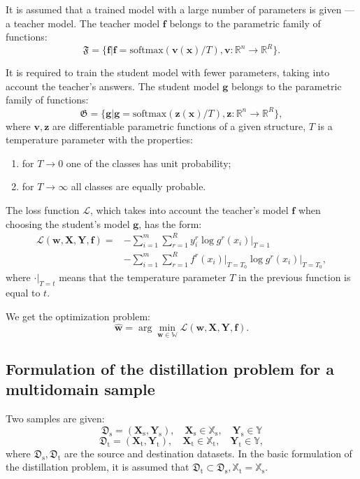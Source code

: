 \documentclass[12pt]{article}
\begin{document}
It is assumed that a trained model with a large number of parameters is given --- a teacher model. The teacher model $\mathbf{f}$ belongs to the parametric family of functions: $$\mathfrak{F}=\{\mathbf{f}|\mathbf{f}=\text{softmax}(\mathbf{v(x)} /T), \mathbf{v}:\mathbb{R}^{n}\rightarrow \mathbb{R}^{R}\}.$$

It is required to train the student model with fewer parameters, taking into account the teacher's answers. The student model $\mathbf{g}$ belongs to the parametric family of functions: $$\mathfrak{G}=\{\mathbf{g}|\mathbf{g}=\text{softmax}(\mathbf{z(x)} /T), \mathbf{z}:\mathbb{R}^{n}\rightarrow \mathbb{R}^{R}\},$$
where $\mathbf{v, z}$ are differentiable parametric functions of a given structure, $T$ is a temperature parameter with the properties:
\begin{enumerate}
     \item for $T \rightarrow 0$ one of the classes has unit probability;
     \item for $T \rightarrow \infty$ all classes are equally probable.
\end{enumerate}

The loss function $\mathcal{L}$, which takes into account the teacher's model $\mathbf{f}$ when choosing the student's model $\mathbf{g}$, has the form:
\[
\begin{aligned}
     \mathcal{L}(\mathbf{w,X,Y,f})=&-\sum\limits_{i=1}^{m}\sum\limits_{r=1}^{R}y_{i }^{r}\log{g^{r}(x_{i})}\bigr|_{T=1}\\
     &-\sum\limits_{i=1}^{m}\sum\limits_{r=1}^{R}f^{r}(x_{i})\bigr|_{T=T_{0} }\log{g^{r}(x_{i})}\bigr|_{T=T_{0}},
\end{aligned}
\]
where $\cdot\bigr|_{T=t}$ means that the temperature parameter $T$ in the previous function is equal to $t$.

We get the optimization problem:
$$\hat{\mathbf{w}} = \arg\min_{\mathbf{w} \in \mathbb{W}} \mathcal{L}(\mathbf{w,X,Y,f}).$$


\subsection{Formulation of the distillation problem for a multidomain sample}

Two samples are given:
$$\mathfrak{D}_{\text{s}}=(\mathbf{X}_{\text{s}},\mathbf{Y}_{\text{s}}),
\quad \mathbf{X}_{\text{s}} \in \mathbb{X}_{\text{s}},
\quad \mathbf{Y}_{\text{s}} \in \mathbb{Y}$$
$$\mathfrak{D}_{\text{t}}=(\mathbf{X}_{\text{t}},\mathbf{Y}_{\text{t}}), \quad \mathbf {X}_{\text{t}} \in \mathbb{X}_{\text{t}},
\quad \mathbf{Y}_{\text{t}} \in \mathbb{Y},$$
where $\mathfrak{D}_{\text{s}}, \mathfrak{D}_{\text{t}}$ are the source and destination datasets. In the basic formulation of the distillation problem, it is assumed that
$\mathfrak{D}_{\text{t}} \subset \mathfrak{D}_{\text{s}},
\mathbb{X}_{\text{t}}=\mathbb{X}_{\text{s}}$.
\end{document}
